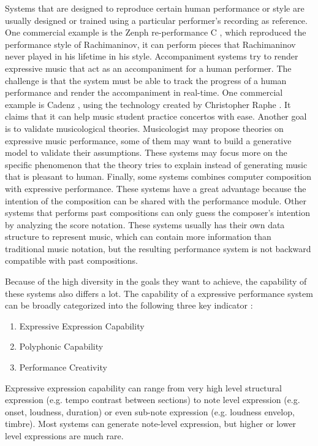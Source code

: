 Systems that are designed to reproduce certain human performance or style are usually designed or trained using a particular performer's recording as reference. One commercial example is the Zenph re-performance C \cite{zenph}, which reproduced the performance style of Rachimaninov, it can perform pieces that Rachimaninov never played in his lifetime in his style. 
%
%
Accompaniment systems try to render expressive music that act as an accompaniment for a human performer. The challenge is that the system must be able to track the progress of a human performance and render the accompaniment in real-time. One commercial example is Cadenz \cite{cadenza}, using the technology created by Christopher Raphe \cite{chris}. It claims that it can help music student practice concertos with ease.
%
Another goal is to validate musicological theories. Musicologist may propose theories on expressive music performance, some of them may want to build a generative model to validate their assumptions. These systems may focus more on the specific phenomenon that the theory tries to explain instead of generating music that is pleasant to human. 
%
Finally, some systems combines computer composition with expressive performance. These systems have a great advantage because the intention of the composition can be shared with the performance module. Other systems that performs past compositions can only guess the composer's intention by analyzing the score notation. These systems usually has their own data structure to represent music, which can contain more information than traditional music notation, but the resulting performance system is not backward compatible with past compositions.


Because of the high diversity in the goals they want to achieve, the capability of these systems also differs a lot. The capability of a expressive performance system can be broadly categorized into the following three key indicator \cite{THEBOOK}:
\begin{enumerate}
   \item Expressive Expression Capability
   \item Polyphonic Capability
   \item Performance Creativity
\end{enumerate}

Expressive expression capability can range from very high level structural expression (e.g. tempo contrast between sections) to note level expression (e.g. onset, loudness, duration) or even sub-note expression (e.g. loudness envelop, timbre). Most systems can generate note-level expression, but higher or lower level expressions are much rare.

